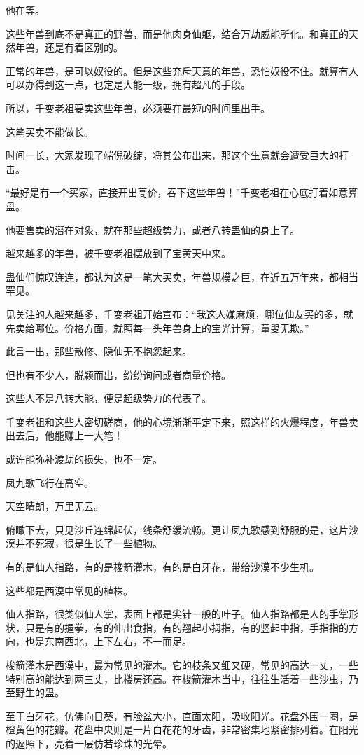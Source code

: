 \begin{this_body}
他在等。

这些年兽到底不是真正的野兽，而是他肉身仙躯，结合万劫威能所化。和真正的天然年兽，还是有着区别的。

正常的年兽，是可以奴役的。但是这些充斥天意的年兽，恐怕奴役不住。就算有人可以办得到这一点，也定是大能一级，拥有超凡的手段。

所以，千变老祖要卖这些年兽，必须要在最短的时间里出手。

这笔买卖不能做长。

时间一长，大家发现了端倪破绽，将其公布出来，那这个生意就会遭受巨大的打击。

“最好是有一个买家，直接开出高价，吞下这些年兽！”千变老祖在心底打着如意算盘。

他要售卖的潜在对象，就在那些超级势力，或者八转蛊仙的身上了。

越来越多的年兽，被千变老祖摆放到了宝黄天中来。

蛊仙们惊叹连连，都认为这是一笔大买卖，年兽规模之巨，在近五万年来，都相当罕见。

见关注的人越来越多，千变老祖开始宣布：“我这人嫌麻烦，哪位仙友买的多，就先卖给哪位。价格方面，就照每一头年兽身上的宝光计算，童叟无欺。”

此言一出，那些散修、隐仙无不抱怨起来。

但也有不少人，脱颖而出，纷纷询问或者商量价格。

这些人不是八转大能，便是超级势力的代表了。

千变老祖和这些人密切磋商，他的心境渐渐平定下来，照这样的火爆程度，年兽卖出去后，他能赚上一大笔！

或许能弥补渡劫的损失，也不一定。

凤九歌飞行在高空。

天空晴朗，万里无云。

俯瞰下去，只见沙丘连绵起伏，线条舒缓流畅。更让凤九歌感到舒服的是，这片沙漠并不死寂，很是生长了一些植物。

有的是仙人指路，有的是梭箭灌木，有的是白牙花，带给沙漠不少生机。

这些都是西漠中常见的植株。

仙人指路，很类似仙人掌，表面上都是尖针一般的叶子。仙人指路都是人的手掌形状，只是有的握拳，有的伸出食指，有的翘起小拇指，有的竖起中指，手指指的方向，也是东南西北，上下左右，不一而足。

梭箭灌木是西漠中，最为常见的灌木。它的枝条又细又硬，常见的高达一丈，一些特别高的能达到两三丈，比楼房还高。在梭箭灌木当中，往往生活着一些沙虫，乃至野生的蛊。

至于白牙花，仿佛向日葵，有脸盆大小，直面太阳，吸收阳光。花盘外围一圈，是橙黄色的花瓣。花盘中央则是一片白花花的牙齿，非常密集地紧密排列着。在阳光的返照下，亮着一层仿若珍珠的光晕。


\end{this_body}
